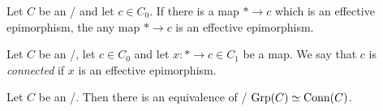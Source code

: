\begin{lemma}
    Let $C$ be an \inftytop/ and let $c\in C_0$.
    If there is a map $*\to c$ which is an effective epimorphism, the any map $*\to c$ is an effective epimorphism.
\end{lemma}
\begin{definition}
    Let $C$ be an \inftytop/, let $c\in C_0$ and let $x\colon *\to c\in C_1$ be a map.
    We say that $c$ is \emph{connected} if $x$ is an effective epimorphism.
\end{definition}
\begin{corollary}
    Let $C$ be an \inftytop/. 
    Then there is an equivalence of \inftycats/ $\operatorname{Grp}(C)\simeq\operatorname{Conn}(C)$.
\end{corollary}